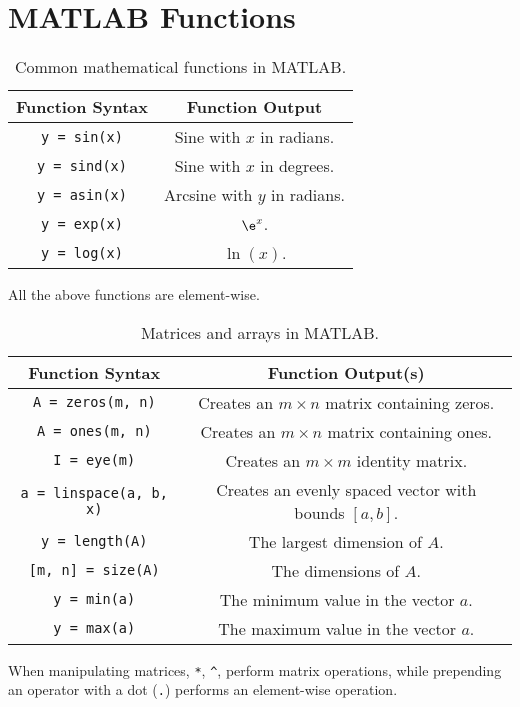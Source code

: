 \documentclass{article}
\begin{document}
\section{MATLAB Functions}
\begin{table}[H]
    \centering
    \begin{tabular}{c | c}
        \toprule
        Function Syntax         & Function Output              \\
        \midrule
        \lstinline!y = sin(x)!  & Sine with $x$ in radians.    \\
        \lstinline!y = sind(x)! & Sine with $x$ in degrees.    \\
        \lstinline!y = asin(x)! & Arcsine with $y$ in radians. \\
        \lstinline!y = exp(x)!  & $\e^x$.                      \\
        \lstinline!y = log(x)!  & $\ln{\left( x \right)}$.     \\
        \bottomrule
    \end{tabular}
    \caption{Common mathematical functions in MATLAB.}
\end{table}
All the above functions are element-wise.
\begin{table}[H]
    \centering
    \begin{tabular}{c | c}
        \toprule
        Function Syntax                   & Function Output(s)                                               \\
        \midrule
        \lstinline!A = zeros(m, n)!       & Creates an $m \times n$ matrix containing zeros.                 \\
        \lstinline!A = ones(m, n)!        & Creates an $m \times n$ matrix containing ones.                  \\
        \lstinline!I = eye(m)!            & Creates an $m \times m$ identity matrix.                         \\
        \lstinline!a = linspace(a, b, x)! & Creates an evenly spaced vector with bounds $\left[a, b\right]$. \\
        \lstinline!y = length(A)!         & The largest dimension of $A$.                                    \\
        \lstinline![m, n] = size(A)!      & The dimensions of $A$.                                           \\
        \lstinline!y = min(a)!            & The minimum value in the vector $a$.                             \\
        \lstinline!y = max(a)!            & The maximum value in the vector $a$.                             \\
        \bottomrule
    \end{tabular}
    \caption{Matrices and arrays in MATLAB.}
\end{table}
When manipulating matrices, \verb!*!, \verb!^!, perform matrix operations, while prepending an operator with a dot (\verb!.!) performs an element-wise operation.
\end{document}
